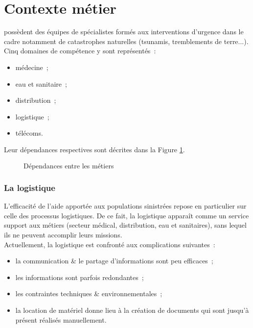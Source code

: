 \section{Contexte métier}
\mo possèdent des équipes de spécialistes formés aux interventions d'urgence dans le cadre notamment de catastrophes naturelles (tsunamis, tremblements de terre...).
Cinq domaines de compétence y sont représentés~:
\begin{itemize}
	\item médecine~;
	\item eau et sanitaire~;
	\item distribution~;
	\item logistique~;
	\item télécoms.
\end{itemize}
Leur dépendances respectives sont décrites dans la Figure \ref{dep}.
\begin{figure}[htbp]
	\centering
	\caption{Dépendances entre les métiers}
	\label{dep}
\end{figure}

\subsubsection{La logistique}
L'efficacité de l'aide apportée aux populations sinistrées repose en particulier sur celle des processus logistiques.
De ce fait, la logistique apparaît comme un service support aux métiers (secteur médical, distribution, eau et sanitaires), sans lequel ils ne peuvent accomplir leurs missions.
\\
Actuellement, la logistique est confronté aux complications suivantes~:
\begin{itemize}
	\item la communication \& le partage d'informations sont peu efficaces~;
	\item les informations sont parfois redondantes~;
	\item les contraintes techniques \& environnementales~;
	\item la location de matériel donne lieu à la création de documents qui sont jusqu'à présent réalisés manuellement.
\end{itemize}

